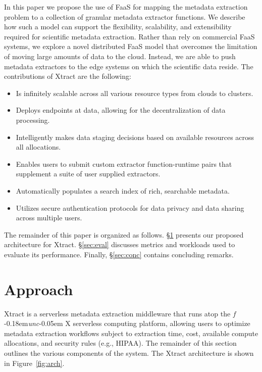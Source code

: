 \documentclass[sigconf, 9pt]{acmart}
\newcommand{\tyler}[1]{}
\newcommand{\kyle}[1]{}
\newcommand{\tyler}[1]{{\textcolor{cyan}{ tyler: #1 }}}
\newcommand{\kyle}[1]{{\textcolor{purple}{ Kyle: #1 }}}
\newcommand{\name}{Xtract}
\newcommand{\funcx}{$f$\kern-0.18em\emph{unc}\kern-0.05em X}
\begin{document}
\kyle{This paragraph repeats some of the previous one. I would vote to remove the previous paragraph}
\tyler{unplagiarize the first 3 sentences here}
In this paper we propose the use of FaaS for mapping the metadata extraction problem to a 
collection of granular metadata extractor functions. 
We describe how such a model can support the flexibility, scalability, and extensibility required
for scientific metadata extraction. 
Rather than rely on commercial FaaS systems, we explore a novel distributed FaaS model 
that overcomes the limitation of moving large amounts of data to the cloud. 
Instead, we are able to push
metadata extractors to the edge systems on which the scientific data reside. 
The contributions of \name{} are the following: 
\begin{itemize}
\item Is infinitely scalable across all various resource types from clouds to clusters. 
\item Deploys endpoints at data, allowing for the decentralization of data processing. 
\item Intelligently makes data staging decisions based on available resources across all allocations. \kyle{what is meant by all allocations?}
\item Enables users to submit custom extractor function-runtime pairs that supplement a suite of user supplied extractors.
\item Automatically populates a search index of rich, searchable metadata. 
\item Utilizes secure authentication protocols for data privacy and data sharing across multiple users. 
\end{itemize}

\kyle{I'd like to see more about the novelty of the assembled pipelines in this list}


The remainder of this paper is organized as follows. 
\S\ref{sec:approach} presents our proposed architecture for \name{}. 
\S\ref{sec:eval} discusses metrics and workloads used to evaluate its performance. 
Finally, \S\ref{sec:conc} contains concluding remarks.


\section{Approach}
\label{sec:approach}

\name{} is a serverless metadata extraction middleware that runs atop the \funcx{} serverless 
computing platform, allowing users to optimize metadata extraction workflows subject to 
extraction time, cost, available compute allocations, and security rules (e.g., HIPAA). The remainder 
of this section outlines the various components of the system. The \name{} architecture is shown in Figure~\ref{fig:arch}.
\end{document}
